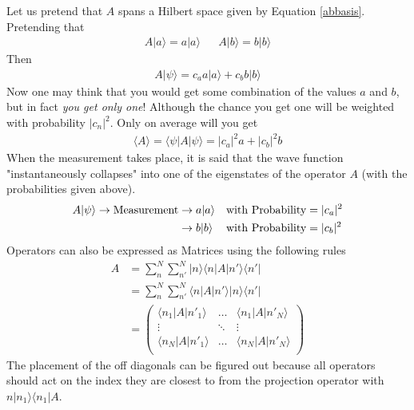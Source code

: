  Let us pretend that $A$ spans a Hilbert space given by Equation \ref{abbasis}. Pretending that
\begin{align}
A|a\rangle = a |a\rangle && A|b\rangle = b|b\rangle
\end{align}
Then
\begin{align}
A|\psi\rangle = c_a a|a\rangle + c_b b|b\rangle 
\end{align}
Now one may think that you would get some combination of the values $a$ and $b$, but in fact \emph{you get only one}! Although the chance you get one will be weighted with probability $|c_n|^2$. Only on average will you get
\begin{align}
\langle A\rangle = \langle \psi | A|\psi\rangle = |c_a|^2 a + |c_b|^2 b
\end{align}
When the measurement takes place, it is said that the wave function "instantaneously collapses" into one of the eigenstates of the operator $A$ (with the probabilities given above).
\begin{align}
A|\psi\rangle \rightarrow \rm{Measurement} &\rightarrow a|a\rangle  && \textrm{with~Probability} =  |c_a|^2 \\
&\rightarrow b|b\rangle  && \textrm{with~Probability} =  |c_b|^2 
\end{align}
Operators can also be expressed as Matrices using the following rules
\begin{align}
A &= \sum_n^N\sum_{n'}^N |n\rangle\langle n| A |n'\rangle \langle n'|\\
&=\sum_n^N\sum_{n'}^N\langle n| A |n'\rangle |n\rangle\langle n'|\\
&= \left(
{\begin{array}{ccc}
\langle n_1|A |n'_1\rangle&\hdots&\langle n_1|A|n'_N\rangle\\
\vdots&\ddots&\vdots\\
\langle n_N| A|n'_1\rangle &\hdots&\langle n_N | A | n'_N\rangle\\
\end{array}}
\right)
\end{align}
The placement of the off diagonals can be figured out because all operators should act on the index they are closest to from the projection operator with $n|n_1\rangle\langle n_1|A$.


